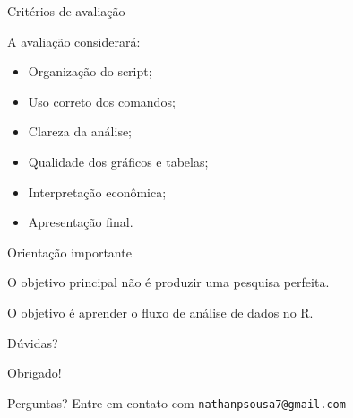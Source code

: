 \documentclass[11pt]{beamer}
\begin{document}
	\begin{frame}{Critérios de avaliação}
		
		A avaliação considerará:
		
		\begin{itemize}
			\item Organização do script;
			\item Uso correto dos comandos;
			\item Clareza da análise;
			\item Qualidade dos gráficos e tabelas;
			\item Interpretação econômica;
			\item Apresentação final.
		\end{itemize}
		
	\end{frame}
	
	\begin{frame}{Orientação importante}
		
		\begin{center}
			\Large
			O objetivo principal não é produzir uma pesquisa perfeita.
			
			\vspace{0.5cm}
			
			\Large
			O objetivo é aprender o fluxo de análise de dados no R.
		\end{center}
		
	\end{frame}
	
	\begin{frame}{Dúvidas?}
		
		\centering
		
		\Huge Obrigado!
		
		\vspace{1cm}
		
		\Large Perguntas? Entre em contato com \texttt{nathanpsousa7@gmail.com}
		
	\end{frame}
	
\end{document}
